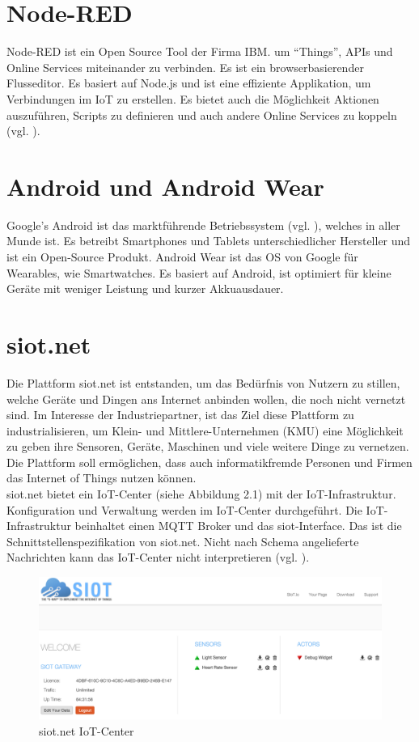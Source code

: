 \section{Node-RED}
Node-RED ist ein Open Source Tool der Firma IBM. um "`Things"', \gls{API}s und Online Services miteinander zu verbinden. Es ist ein browserbasierender Flusseditor. Es basiert auf Node.js und ist eine effiziente Applikation, um Verbindungen im \gls{IoT} zu erstellen. Es bietet auch die Möglichkeit Aktionen auszuführen, Scripts zu definieren und auch andere Online Services zu koppeln (vgl. \cite{nh:nRed}).

\section{Android und Android Wear}
Google's Android ist das marktführende Betriebssystem (vgl. \cite{stat:spos}), welches in aller Munde ist. Es betreibt Smartphones und Tablets unterschiedlicher Hersteller und ist ein Open-Source Produkt. Android Wear ist das OS von Google für Wearables, wie Smartwatches. Es basiert auf Android, ist optimiert für kleine Geräte mit weniger Leistung und kurzer Akkuausdauer.

\section{siot.net}
Die Plattform siot.net ist entstanden, um das Bedürfnis von Nutzern zu stillen, welche Geräte und Dingen ans Internet anbinden wollen, die noch nicht vernetzt sind. Im Interesse der Industriepartner, ist das Ziel diese Plattform zu industrialisieren, um Klein- und Mittlere-Unternehmen (KMU) eine Möglichkeit zu geben ihre Sensoren, Geräte, Maschinen und viele weitere Dinge zu vernetzen. Die Plattform soll ermöglichen, dass auch informatikfremde Personen und Firmen das Internet of Things nutzen können.\\
siot.net bietet ein \gls{IoT}-Center (siehe Abbildung 2.1) mit der \gls{IoT}-Infrastruktur. Konfiguration und Verwaltung werden im \gls{IoT}-Center durchgeführt. Die \gls{IoT}-Infrastruktur beinhaltet einen \gls{MQTT} Broker und das siot-Interface. Das ist die Schnittstellenspezifikation von siot.net. Nicht nach Schema angelieferte Nachrichten kann das \gls{IoT}-Center nicht interpretieren (vgl. \cite{siot:cobo}).\\
\begin{figure}[h]
  \centering
  \includegraphics[scale=0.35]{98_Bilder/02_Grundlagen/siotcenter}
  \caption[siot.net IoT-Center]{siot.net \gls{IoT}-Center}
\end{figure}
